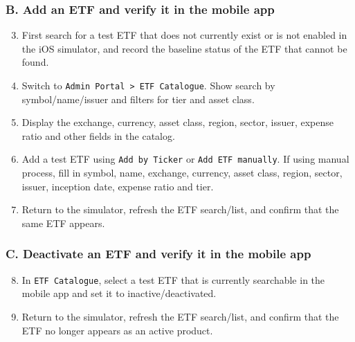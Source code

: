 \subsubsection{B. Add an ETF and verify it in the mobile app}
\begin{enumerate}
\setcounter{enumi}{2}
\item First search for a test ETF that does not currently exist or is not enabled in the iOS simulator, and record the baseline status of the ETF that cannot be found.
\item Switch to \texttt{Admin Portal \textgreater{} ETF Catalogue}. Show search by symbol/\allowbreak{}name/\allowbreak{}issuer and filters for tier and asset class.
\item Display the exchange, currency, asset class, region, sector, issuer, expense ratio and other fields in the catalog.
\item Add a test ETF using \texttt{Add by Ticker} or \texttt{Add ETF manually}. If using manual process, fill in symbol, name, exchange, currency, asset class, region, sector, issuer, inception date, expense ratio and tier.
\item Return to the simulator, refresh the ETF search/\allowbreak{}list, and confirm that the same ETF appears.
\end{enumerate}
\subsubsection{C. Deactivate an ETF and verify it in the mobile app}
\begin{enumerate}
\setcounter{enumi}{7}
\item In \texttt{ETF Catalogue}, select a test ETF that is currently searchable in the mobile app and set it to inactive/\allowbreak{}deactivated.
\item Return to the simulator, refresh the ETF search/\allowbreak{}list, and confirm that the ETF no longer appears as an active product.
\end{enumerate}
